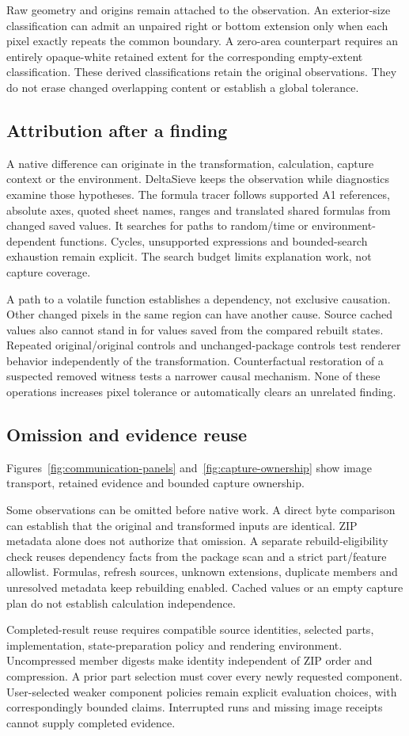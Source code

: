 Raw geometry and origins remain attached to the observation. An exterior-size
classification can admit an unpaired right or bottom extension only when each
pixel exactly repeats the common boundary. A zero-area counterpart requires
an entirely opaque-white retained extent for the corresponding empty-extent
classification. These derived classifications retain the original observations.
They do not erase changed overlapping content or establish a global tolerance.

\subsection{Attribution after a finding}
A native difference can originate in the transformation, calculation, capture
context or the environment. DeltaSieve keeps the observation while diagnostics
examine those hypotheses. The formula tracer follows supported A1 references,
absolute axes, quoted sheet names, ranges and translated shared formulas from
changed saved values. It searches for paths to random/time or environment-dependent
functions. Cycles, unsupported expressions and bounded-search exhaustion remain
explicit. The search budget limits explanation work, not capture coverage.

A path to a volatile function establishes a dependency, not exclusive causation.
Other changed pixels in the same region can have another cause. Source cached
values also cannot stand in for values saved from the compared rebuilt states.
Repeated original/original controls
and unchanged-package controls test renderer behavior independently of the
transformation. Counterfactual restoration of a suspected removed witness tests
a narrower causal mechanism. None of these operations increases pixel tolerance
or automatically clears an unrelated finding.

\subsection{Omission and evidence reuse}
Figures~\ref{fig:communication-panels} and~\ref{fig:capture-ownership} show
image transport, retained evidence and bounded capture ownership.


Some observations can be omitted before native work. A direct byte comparison
can establish that the original and transformed inputs are identical. ZIP
metadata alone does not authorize that omission. A separate rebuild-eligibility
check reuses dependency facts from the package scan and a strict part/feature
allowlist. Formulas, refresh sources, unknown extensions, duplicate members and
unresolved metadata keep rebuilding enabled. Cached values or an empty capture
plan do not establish calculation independence.

Completed-result reuse requires compatible source identities, selected parts,
implementation, state-preparation policy and rendering environment. Uncompressed member
digests make identity independent of ZIP order and compression. A prior
part selection must cover every newly requested component. User-selected weaker
component policies remain explicit evaluation choices, with correspondingly
bounded claims. Interrupted runs and missing image receipts cannot supply
completed evidence.

